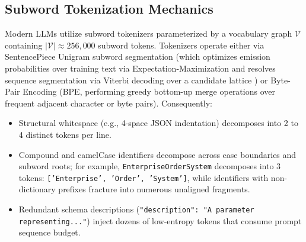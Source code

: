 \documentclass[conference,10pt]{IEEEtran}
\begin{document}
\subsection{Subword Tokenization Mechanics}
Modern LLMs utilize subword tokenizers parameterized by a vocabulary graph $\mathcal{V}$ containing $|\mathcal{V}| \approx 256{,}000$ subword tokens. Tokenizers operate either via SentencePiece Unigram subword segmentation (which optimizes emission probabilities over training text via Expectation-Maximization and resolves sequence segmentation via Viterbi decoding over a candidate lattice \cite{kudo2018unigram, gemini2024}) or Byte-Pair Encoding (BPE, performing greedy bottom-up merge operations over frequent adjacent character or byte pairs). Consequently:
\begin{itemize}
    \item Structural whitespace (e.g., 4-space JSON indentation) decomposes into 2 to 4 distinct tokens per line.
    \item Compound and camelCase identifiers decompose across case boundaries and subword roots; for example, \texttt{EnterpriseOrderSystem} decomposes into 3 tokens: \texttt{['Enterprise', 'Order', 'System']}, while identifiers with non-dictionary prefixes fracture into numerous unaligned fragments.
    \item Redundant schema descriptions (\texttt{"description": "A parameter representing..."}) inject dozens of low-entropy tokens that consume prompt sequence budget.
\end{itemize}
\end{document}
